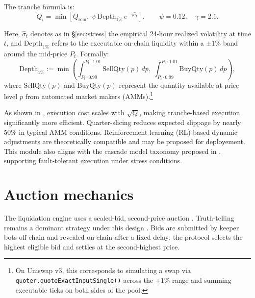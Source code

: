 \documentclass[11pt]{article}
\newcommand{\secref}[1]{\hyperref[#1]{\S\ref*{#1}}}
\begin{document}
The tranche formula is:
\begin{equation}\label{eq:tranche}
Q_i = \min \left[ Q_{\text{rem}},\;
                  \psi\,\text{Depth}_{1\%}\,e^{-\gamma \widehat{\sigma}_t} \right],
\qquad \psi = 0.12,\quad \gamma = 2.1.
\end{equation}

Here, \( \widehat{\sigma}_t \) denotes as in \secref{sec:stress} the empirical 24-hour realized volatility at time \( t \), and \( \text{Depth}_{1\%} \) refers to the executable on-chain liquidity within a \(\pm 1\%\) band around the mid-price \( P_t \). Formally:
\[
\text{Depth}_{1\%} := \min \left(
\int_{P_t \cdot 0.99}^{P_t \cdot 1.01} \text{SellQty}(p)\,dp,\;
\int_{P_t \cdot 0.99}^{P_t \cdot 1.01} \text{BuyQty}(p)\,dp
\right),
\]
where \( \text{SellQty}(p) \) and \( \text{BuyQty}(p) \) represent the quantity available at price level \( p \) from automated market makers (AMMs).\footnote{On Uniswap v3, this corresponds to simulating a swap via \texttt{quoter.quoteExactInputSingle()} across the \(\pm 1\%\) range and summing executable ticks on both sides of the pool.}

As shown in \textcite{almgren2000optimal}, execution cost scales with \( \sqrt{Q} \), making tranche-based execution significantly more efficient. Quarter-slicing reduces expected slippage by nearly 50\% in typical AMM conditions.  
Reinforcement learning (RL)-based dynamic adjustments \parencite{zhang2023adaptive} are theoretically compatible and may be proposed for deployement.  
This module also aligns with the cascade model taxonomy proposed in \textcite{zhao2025reliability}, supporting fault-tolerant execution under stress conditions.





\section{Auction mechanics}
\label{sec:auction}

The liquidation engine uses a sealed-bid, second-price \parencite{vickrey1961counterspeculation} auction . Truth-telling remains a dominant strategy under this design \parencite{myerson1994bayesian}. Bids are submitted by keeper bots off-chain and revealed on-chain after a fixed delay; the protocol selects the highest eligible bid and settles at the second-highest price.
\end{document}

